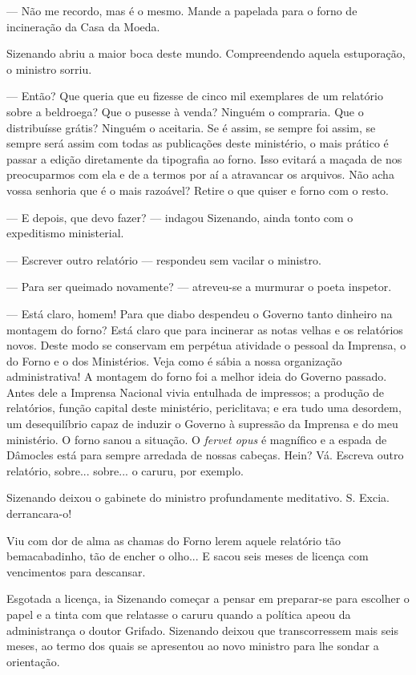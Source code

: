 --- Não me recordo, mas é o mesmo. Mande a papelada para o forno de
incineração da Casa da Moeda.

Sizenando abriu a maior boca deste mundo. Compreendendo aquela
estuporação, o ministro sorriu.

--- Então? Que queria que eu fizesse de cinco mil exemplares de um
relatório sobre a beldroega? Que o pusesse à venda? Ninguém o compraria.
Que o distribuísse grátis? Ninguém o aceitaria. Se é assim, se sempre
foi assim, se sempre será assim com todas as publicações deste
ministério, o mais prático é passar a edição diretamente da tipografia
ao forno. Isso evitará a maçada de nos preocuparmos com ela e de a
termos por aí a atravancar os arquivos. Não acha vossa senhoria que é o
mais razoável? Retire o que quiser e forno com o resto.

--- E depois, que devo fazer? --- indagou Sizenando, ainda tonto com o
expeditismo ministerial.

--- Escrever outro relatório --- respondeu sem vacilar o ministro.

--- Para ser queimado novamente? --- atreveu-se a murmurar o poeta
inspetor.

--- Está claro, homem! Para que diabo despendeu o Governo tanto dinheiro
na montagem do forno? Está claro que para incinerar as notas velhas e os
relatórios novos. Deste modo se conservam em perpétua atividade o
pessoal da Imprensa, o do Forno e o dos Ministérios. Veja como é sábia a
nossa organização administrativa! A montagem do forno foi a melhor ideia
do Governo passado. Antes dele a Imprensa Nacional vivia entulhada de
impressos; a produção de relatórios, função capital deste ministério,
periclitava; e era tudo uma desordem, um desequilíbrio capaz de induzir
o Governo à supressão da Imprensa e do meu ministério. O forno sanou a
situação. O \emph{fervet opus} é magnífico e a espada de Dâmocles está
para sempre arredada de nossas cabeças. Hein? Vá. Escreva outro
relatório, sobre... sobre... o caruru, por exemplo.

Sizenando deixou o gabinete do ministro profundamente meditativo. S.
Excia. derrancara-o!

Viu com dor de alma as chamas do Forno lerem aquele relatório tão
bemacabadinho, tão de encher o olho... E sacou seis meses de licença com
vencimentos para descansar.

Esgotada a licença, ia Sizenando começar a pensar em preparar-se para
escolher o papel e a tinta com que relatasse o caruru quando a política
apeou da administrança o doutor Grifado. Sizenando deixou que
transcorressem mais seis meses, ao termo dos quais se apresentou ao novo
ministro para lhe sondar a orientação.

